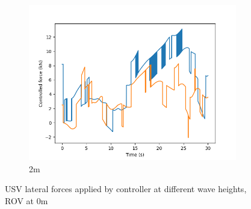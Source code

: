 \documentclass[class=article, crop=false]{standalone}
\begin{document}
\begin{figure}
\begin{subfigure}[b]{0.48\textwidth}
        \includegraphics{scenario1/rov-0m/2.0m/usv_forces}
        \caption{2m}
        \label{}
    \end{subfigure}

    \caption{USV lateral forces applied by controller at different wave heights, ROV at 0m}
\end{figure}
\end{document}
